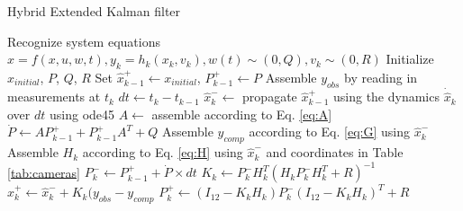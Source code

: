 \documentclass[letterpaper, preprint, paper,11pt]{AAS}	%
\begin{document}
\begin{algorithm}[H]
\footnotesize
\caption{Hybrid Extended Kalman filter}
\label{alg:EKF}
\begin{algorithmic}[1]
\State Recognize system equations $\hat{x}=f(x,u,w,t), y_k=h_k(x_k,v_k), w(t)\sim(0,Q), v_k\sim(0,R)$
\State Initialize $x_{initial}$, $P$, $Q$, $R$
\State Set $\hat{x}_{k-1}^+ \gets x_{initial}$, $P_{k-1}^+ \gets P$
    \State Assemble $y_{obs}$ by reading in measurements at $t_k$
    \State $dt \gets t_k - t_{k-1}$
    \State $\hat{x}_k^- \gets$ propagate $\hat{x}_{k-1}^+$ using the dynamics $\dot{\hat{x}}_k$ over $dt$ using ode45
    \State $A \gets$ assemble according to Eq. \ref{eq:A}
    \State $\dot{P} \gets AP_{k-1}^+ + P_{k-1}^+A^T + Q$
    \State Assemble $y_{comp}$ according to Eq. \ref{eq:G} using $\hat{x}_k^-$
    \State Assemble $H_k$ according to Eq. \ref{eq:H} using $\hat{x}_k^-$ and coordinates in Table \ref{tab:cameras}
    \State $P_k^- \gets P_{k-1}^+ + \dot{P}\times dt$
    \State $K_k \gets P_k^- H_k^T(H_kP_k^-H_k^T+R)^{-1}$
    \State $\hat{x}_k^+ \gets \hat{x}_k^- + K_k(y_{obs}-y_{comp}$
    \State $P_k^+\gets (I_{12}-K_kH_k)P_k^-(I_{12}-K_kH_k)^T + R$
\EndFor
\end{algorithmic}
\end{algorithm}
\end{document}
